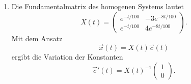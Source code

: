 \begin{enumerate}
          Die allgemeine Lösung des inhomogenen Systems lautet
          \[
              \vec x(t)
              =c_1\begin{pmatrix}1\\1\end{pmatrix}e^{-t/100}
              +c_2\begin{pmatrix}-3\\4\end{pmatrix}e^{-8t/100}
              +\frac12\begin{pmatrix}125\\100\end{pmatrix}.
          \]

          Mit den Anfangsbedingungen \(x_1(0)=x_2(0)=0\)
          erhalten wir
          \[
              \begin{cases}
                  c_1-3c_2+\dfrac{125}{2}=0, \\[2mm]
                  c_1+4c_2+50=0.
              \end{cases}
          \]
          Daraus ergeben sich
          \[
              c_1=-\frac{400}{7},
              \qquad
              c_2=\frac{25}{14}.
          \]

          Die gesuchte Lösung ist also
          \[
              \boxed{
                  \vec x(t)
                  =-\frac{400}{7}
                  \begin{pmatrix}1\\1\end{pmatrix}e^{-t/100}
                  +\frac{25}{14}
                  \begin{pmatrix}-3\\4\end{pmatrix}e^{-8t/100}
                  +\frac12\begin{pmatrix}125\\100\end{pmatrix}.
              }
          \]

    \item Die Fundamentalmatrix des homogenen Systems lautet
          \[
              X(t)=
              \begin{pmatrix}
                  e^{-t/100} & -3e^{-8t/100} \\
                  e^{-t/100} & 4e^{-8t/100}
              \end{pmatrix}.
          \]
          Mit dem Ansatz
          \[
              \vec x(t)=X(t)\vec c(t)
          \]
          ergibt die Variation der Konstanten
          \[
              \vec c'(t)
              =X(t)^{-1}\begin{pmatrix}1\\0\end{pmatrix}.
          \]


\end{enumerate}
